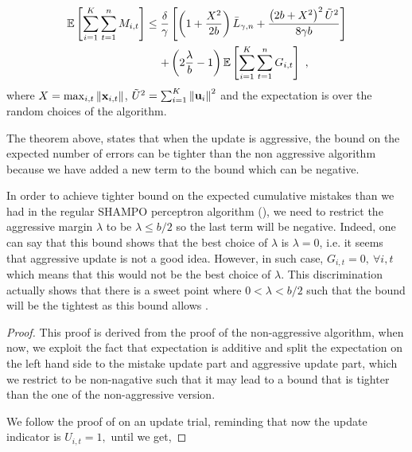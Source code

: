 {\begin{theorem}
\begin{displaymath}
\begin{split}
\mathbb{E}\left[ \sum_{i=1}^{K}\sum_{t=1}^{n}{M_{i,t}} \right]
\le \frac{\delta}{\gamma}&\left[{\left(1+\frac{X^2}{2b} \right){\bar L}_{\gamma,n}
+\frac{\left({2b+X^2}\right)^2\tilde{U}^2}{8{\gamma}b}}\right]\\ 
+&\left({2\frac{\lambda}{b}-1}\right)\mathbb{E}\left[{\sum_{i=1}^{K}\sum_{t=1}^{n}{G_{i,t}}}\right]~,
\label{bound_aggressive_FO_SHAMPO}
\end{split}
\end{displaymath}
 where $X=\max_{i,t}\Vert\mathbf{x}_{i,t}\Vert$,
$\tilde{U}^2=\sum_{i=1}^{K}\left\Vert {\mathbf{u}_{i}} \right\Vert^2$ and the expectation is over the
random choices of the algorithm.
\end{theorem} \label{thm:FO_bound_aggressive}

\noindent
The theorem above, states that when the update is aggressive, the bound on the expected number of errors
can be tighter than the non aggressive algorithm because we have added a new term to the bound 
which can be negative.     

In order to achieve tighter bound on the expected cumulative mistakes than we had in the regular SHAMPO 
perceptron algorithm (), we need to restrict the aggressive margin  $\lambda$ 
to be $\lambda\le b/2$ so the last term will be negative. Indeed, one can say that this bound shows that the best choice of $\lambda$ is 
$\lambda=0$, i.e. it seems that aggressive update is not a good idea. However, in such case, 
$G_{i,t}=0,~ \forall i,t$ which means that this would not be the best choice of $\lambda$. 
This discrimination actually shows  that there is a sweet point where $0<\lambda<b/2$ such that the 
bound will be the  tightest as this bound allows . 

\begin{proof}
This proof is derived from the proof of the non-aggressive algorithm, when now, 
we exploit the fact that expectation is additive and split the expectation on 
the left hand side to the mistake update part and aggressive update part, which we restrict to be non-nagative 
such that it may lead to a bound that is tighter than the one of the non-aggressive 
version.

We follow the proof of  on an update trial, reminding that now the update 
indicator is  $U_{i,t}=1, $ until we get,  


\end{proof}}
